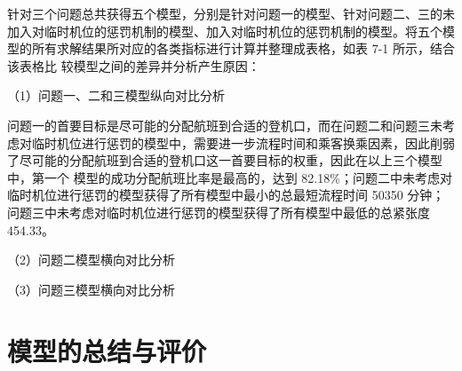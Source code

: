 \documentclass[bwprint]{gmcmthesis}
\numberwithin{figure}{section}
\begin{document}
针对三个问题总共获得五个模型，分别是针对问题一的模型、针对问题二、三的未加入对临时机位的惩罚机制的模型、加入对临时机位的惩罚机制的模型。将五个模型的所有求解结果所对应的各类指标进行计算并整理成表格，如表 7-1 所示，结合该表格比
较模型之间的差异并分析产生原因：

（1）问题一、二和三模型纵向对比分析 \par
问题一的首要目标是尽可能的分配航班到合适的登机口，而在问题二和问题三未考虑对临时机位进行惩罚的模型中，需要进一步流程时间和乘客换乘因素，因此削弱了尽可能的分配航班到合适的登机口这一首要目标的权重，因此在以上三个模型中，第一个
模型的成功分配航班比率是最高的，达到 82.18\%；问题二中未考虑对临时机位进行惩罚的模型获得了所有模型中最小的总最短流程时间 50350 分钟；问题三中未考虑对临时机位进行惩罚的模型获得了所有模型中最低的总紧张度 454.33。

（2）问题二模型横向对比分析

（3）问题三模型横向对比分析

\begin{table}[htbp]
\centering
\caption{模型求解结果对应各类指标对比} 
\end{table}

\section{模型的总结与评价}
\end{document}
